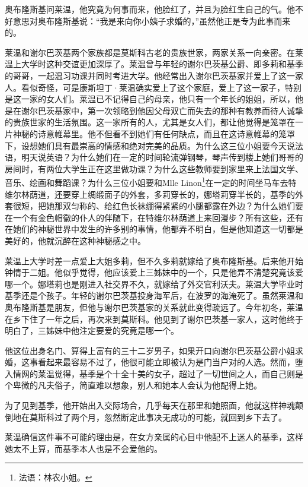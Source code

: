 \par 奥布隆斯基问莱温，他究竟为何事而来，他脸红了，并且为脸红生自己的气。他不好意思对奥布隆斯基说：“我是来向你小姨子求婚的，”虽然他正是专为此事而来的。
\par 莱温和谢尔巴茨基两个家族都是莫斯科古老的贵族世家，两家关系一向亲密。在莱温上大学时这种交谊更加深厚了。莱温曾与年轻的谢尔巴茨基公爵、即多莉和基季的哥哥，一起温习功课并同时考进大学。他经常出入谢尔巴茨基家并爱上了这一家人。看似奇怪，可是康斯坦丁·莱温确实爱上了这个家庭，爱上了这一家子，特别是这一家的女人们。莱温已不记得自己的母亲，他只有一个年长的姐姐，所以，他是在谢尔巴茨基家中，第一次领略到他因父母双亡而失去的那种有教养而待人诚挚的贵族世家的生活氛围。这一家所有的人，尤其是女人们，都让他觉得是笼罩在一片神秘的诗意帷幕里。他不但看不到她们有任何缺点，而且在这诗意帷幕的笼罩下，设想她们具有最崇高的情感和绝对完美的品质。为什么这三位小姐要今天说法语，明天说英语？为什么她们在一定的时间轮流弹钢琴，琴声传到楼上她们哥哥的房间时，有两位大学生正在这里做功课？为什么这些教师要到家里来上法国文学、音乐、绘画和舞蹈课？为什么三位小姐要和Mlle Linon\footnote{法语：林农小姐。}在一定的时间坐马车去特维尔林荫道，还要穿上绸缎面子的外套，多莉穿长的，娜塔莉穿半长的，基季的外套很短，把她那双匀称的、给红色长袜绷得紧紧的小腿都露在外边？为什么她们要在一个有金色帽徽的仆人的伴随下，在特维尔林荫道上来回漫步？所有这些，还有在她们的神秘世界中发生的许多别的事情，他都弄不明白，但是他知道这一切都是美好的，他就沉醉在这种神秘感之中。
\par 莱温上大学时差一点爱上大姐多莉，但不久多莉就嫁给了奥布隆斯基。后来他开始钟情于二姐。他似乎觉得，他应该爱上三姊妹中的一个，只是他弄不清楚究竟该爱哪一个。娜塔莉也是刚进入社交界不久，就嫁给了外交官利沃夫。莱温大学毕业时基季还是个孩子。年轻的谢尔巴茨基投身海军后，在波罗的海淹死了。虽然莱温和奥布隆斯基是朋友，但他与谢尔巴茨基家的关系就此变得疏远了。今年初冬，莱温在乡下住了一年之后，再次来到莫斯科。他见到了谢尔巴茨基一家人，这时他终于明白了，三姊妹中他注定要爱的究竟是哪一个。
\par 他这位出身名门、算得上富有的三十二岁男子，如果开口向谢尔巴茨基公爵小姐求婚，这事看起来最容易不过了，他很可能立即被认为是门当户对的人选。然而，堕入情网的莱温觉得，基季是个十全十美的女子，超过了一切世间之人，而自己则是个卑微的凡夫俗子，简直难以想象，别人和她本人会认为他配得上她。
\par 为了见到基季，他开始出入交际场合，几乎每天在那里和她照面，他就这样神魂颠倒地在莫斯科过了两个月，忽然断定此事决无成功的可能，就回到乡下去了。
\par 莱温确信这件事不可能的理由是，在女方亲属的心目中他配不上迷人的基季，这样她太不上算，而基季本人也是不会爱他的。
